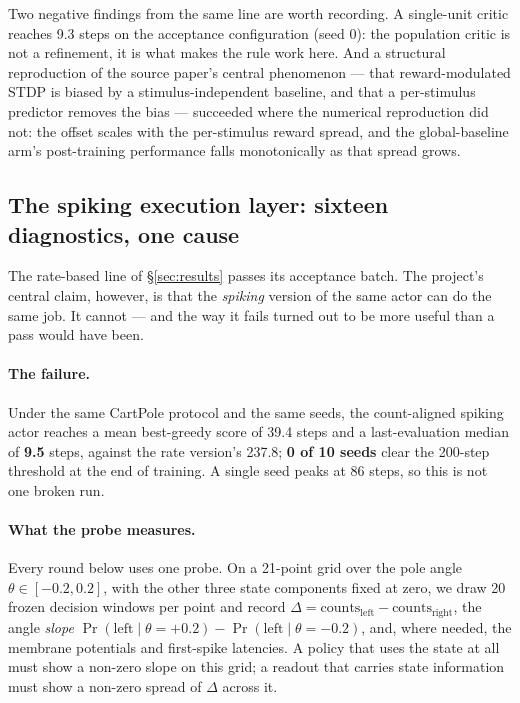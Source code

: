 \documentclass[11pt]{article}
\begin{document}
Two negative findings from the same line are worth recording. A single-unit
critic reaches 9.3 steps on the acceptance configuration (seed 0): the
population critic is not a refinement, it is what makes the rule work here. And
a structural reproduction of the source paper's central phenomenon --- that
reward-modulated STDP is biased by a stimulus-independent baseline, and that a
per-stimulus predictor removes the bias \citep{fremaux2010} --- succeeded where
the numerical reproduction did not: the offset scales with the per-stimulus
reward spread, and
the global-baseline arm's post-training performance falls monotonically as that
spread grows.

\subsection{The spiking execution layer: sixteen diagnostics, one cause}
\label{sec:spiking-diagnostics}

The rate-based line of \S\ref{sec:results} passes its acceptance batch. The
project's central claim, however, is that the \emph{spiking} version of the same
actor can do the same job. It cannot --- and the way it fails turned out to be
more useful than a pass would have been.

\paragraph{The failure.} Under the same CartPole protocol and the same seeds, the
count-aligned spiking actor reaches a mean best-greedy score of 39.4 steps and a
last-evaluation median of \textbf{9.5} steps, against the rate version's 237.8;
\textbf{0 of 10 seeds} clear the 200-step threshold at the end of training. A
single seed peaks at 86 steps, so this is not one broken run.

\paragraph{What the probe measures.} Every round below uses one probe. On a
21-point grid over the pole angle $\theta \in [-0.2, 0.2]$, with the other three
state components fixed at zero, we draw 20 frozen decision windows per point and
record $\Delta = \text{counts}_{\text{left}} - \text{counts}_{\text{right}}$, the
angle \emph{slope} $\Pr(\text{left}\mid \theta{=}{+}0.2) -
\Pr(\text{left}\mid \theta{=}{-}0.2)$, and, where needed, the membrane potentials
and first-spike latencies. A policy that uses the state at all must show a
non-zero slope on this grid; a readout that carries state information must show
a non-zero spread of $\Delta$ across it.
\end{document}
